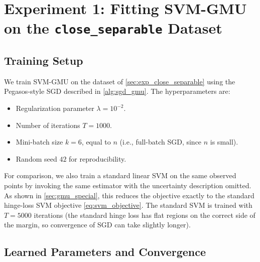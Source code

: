 \documentclass[11pt, letterpaper]{article}
\begin{document}
\section{Experiment 1: Fitting SVM-GMU on the \texttt{close\_separable} Dataset}\label{sec:exp_fit_gmu}

\subsection{Training Setup}

We train SVM-GMU on the dataset of \cref{sec:exp_close_separable} using the Pegasos-style SGD described in \cref{alg:sgd_gmu}. The hyperparameters are:
\begin{itemize}[leftmargin=2em]
    \item Regularization parameter $\lambda = 10^{-2}$.
    \item Number of iterations $T = 1000$.
    \item Mini-batch size $k = 6$, equal to $n$ (i.e., full-batch SGD, since $n$ is small).
    \item Random seed $42$ for reproducibility.
\end{itemize}
For comparison, we also train a standard linear SVM on the same observed points by invoking the same estimator with the uncertainty description omitted. As shown in \cref{sec:gmu_special}, this reduces the objective exactly to the standard hinge-loss SVM objective \cref{eq:svm_objective}. The standard SVM is trained with $T = 5000$ iterations (the standard hinge loss has flat regions on the correct side of the margin, so convergence of SGD can take slightly longer).

\subsection{Learned Parameters and Convergence}
\end{document}
